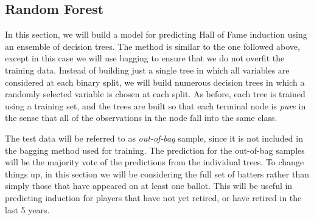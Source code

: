 \documentclass[preprint,12pt]{elsarticle}
\begin{document}




\subsection{Random Forest}
In this section, we will build a model for predicting Hall of Fame induction using an ensemble of decision trees. The method is similar to the one followed above, except in this case we will use bagging to ensure that we do not overfit the training data. Instead of building just a single tree in which all variables are considered at each binary split, we will build numerous decision trees in which a randomly selected variable is chosen at each split. As before, each tree is trained using a training set, and the trees are built so that each terminal node is \textit{pure} in the sense that all of the observations in the node fall into the same class.

The test data will be referred to as \textit{out-of-bag} sample, since it is not included in the bagging method used for training. The prediction for the out-of-bag samples will be the majority vote of the predictions from the individual trees. To change things up, in this section we will be considering the full set of batters rather than simply those that have appeared on at least one ballot. This will be useful in predicting induction for players that have not yet retired, or have retired in the last 5 years.
\end{document}
